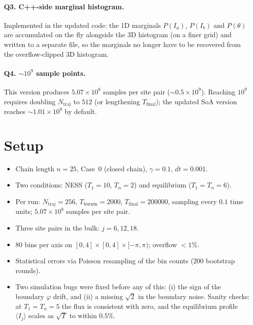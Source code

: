 \documentclass[11pt]{article}
\begin{document}
\paragraph{Q3. C++-side marginal histogram.}
Implemented in the updated code: the 1D marginals $P(I_a)$, $P(I_b)$ and
$P(\theta)$ are accumulated on the fly alongside the 3D histogram (on a finer
grid) and written to a separate file, so the marginals no longer have to be
recovered from the overflow-clipped 3D histogram.

\paragraph{Q4. $\sim 10^9$ sample points.}
This version produces $5.07\times 10^8$ samples per site pair
(${\sim}0.5\times 10^9$). Reaching $10^9$ requires doubling $N_{\mathrm{traj}}$
to $512$ (or lengthening $T_{\mathrm{final}}$); the updated SoA version reaches
${\sim}1.01\times 10^9$ by default.

\section*{Setup}
\begin{itemize}
\item Chain length $n=25$, Case~0 (closed chain), $\gamma=0.1$, $dt=0.001$.
\item Two conditions: NESS ($T_1=10$, $T_n=2$) and equilibrium ($T_1=T_n=6$).
\item Per run: $N_{\mathrm{traj}}=256$, $T_{\mathrm{burnin}}=2000$,
$T_{\mathrm{final}}=200000$, sampling every $0.1$ time units;
$5.07\times 10^8$ samples per site pair.
\item Three site pairs in the bulk: $j=6,12,18$.
\item $80$ bins per axis on $[0,4]\times[0,4]\times[-\pi,\pi)$; overflow $<1\%$.
\item Statistical errors via Poisson resampling of the bin counts
($200$ bootstrap rounds).
\item Two simulation bugs were fixed before any of this: (i) the sign of the
boundary $\varphi$ drift, and (ii) a missing $\sqrt{2}$ in the boundary noise.
Sanity checks: at $T_1=T_n=5$ the flux is consistent with zero, and the
equilibrium profile $\langle I_j\rangle$ scales as $\sqrt{T}$ to within $0.5\%$.
\end{itemize}
\end{document}
